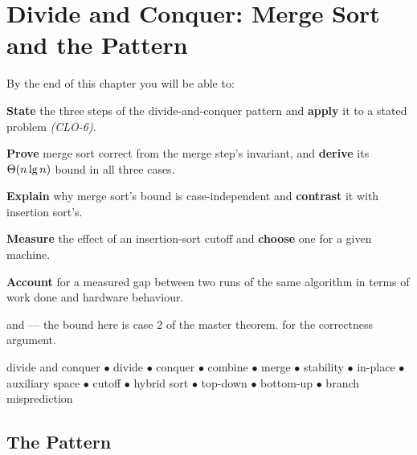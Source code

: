 \chapter{Divide and Conquer: Merge Sort and the Pattern}\label{ch:mergesort}

\begin{outcomes}
By the end of this chapter you will be able to:
\begin{tight}
  \item \textbf{State} the three steps of the divide-and-conquer pattern and
        \textbf{apply} it to a stated problem \emph{(CLO-6)}.
  \item \textbf{Prove} merge sort correct from the merge step's invariant, and
        \textbf{derive} its $\Theta(n\operatorname{lg} n)$ bound in all three cases.
  \item \textbf{Explain} why merge sort's bound is case-independent and
        \textbf{contrast} it with insertion sort's.
  \item \textbf{Measure} the effect of an insertion-sort cutoff and
        \textbf{choose} one for a given machine.
  \item \textbf{Account} for a measured gap between two runs of the same
        algorithm in terms of work done and hardware behaviour.
\end{tight}
\end{outcomes}

\begin{prereq}
 and  --- the bound here is case 2 of the
master theorem.  for the correctness argument.
\end{prereq}

\begin{keyterms}
divide and conquer $\bullet$ divide $\bullet$ conquer $\bullet$ combine
$\bullet$ merge $\bullet$ stability $\bullet$ in-place $\bullet$ auxiliary
space $\bullet$ cutoff $\bullet$ hybrid sort $\bullet$ top-down $\bullet$
bottom-up $\bullet$ branch misprediction
\end{keyterms}

\section{The Pattern}


